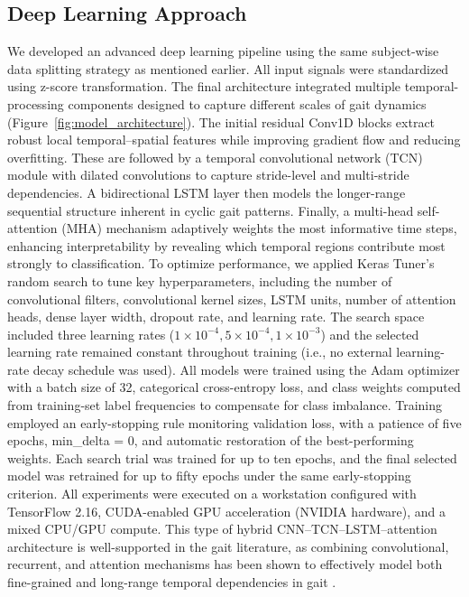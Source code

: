 \documentclass[sensors,article,accept,pdftex,moreauthors]{Definitions/mdpi}
\begin{document}
\subsection{Deep Learning Approach}
\textcolor{revision}{We developed an advanced deep learning pipeline using the same subject-wise data splitting strategy as mentioned earlier. All input \textcolor{revision}{signals} were standardized using z-score transformation. The final architecture integrated multiple temporal-processing components designed to capture different scales of gait dynamics (Figure~\ref{fig:model_architecture}). The initial residual Conv1D blocks extract robust local temporal--spatial features while improving gradient flow and reducing overfitting. These are followed by a temporal convolutional network (TCN) module with dilated convolutions to capture stride-level and multi-stride dependencies. A bidirectional LSTM layer then models the longer-range sequential structure inherent in cyclic gait patterns. Finally, a multi-head self-attention (MHA) mechanism adaptively weights the most informative time steps, enhancing interpretability by revealing which temporal regions contribute most strongly to classification. To optimize performance, we applied Keras Tuner’s random search to tune key hyperparameters, including the number of convolutional filters, convolutional kernel sizes, LSTM units, number of attention heads, dense layer width, dropout rate, and learning rate. {The search space included three learning rates ($1 \times 10^{-4}, 5 \times 10^{-4}, 1 \times 10^{-3}$) and the selected learning rate remained constant throughout training (i.e., no external learning-rate decay schedule was used). All models were trained using the Adam optimizer with a batch size of 32, categorical cross-entropy loss, and class weights computed from training-set label frequencies to compensate for class imbalance. Training employed an early-stopping rule monitoring validation loss, with a patience of five epochs, min\_delta = 0, and automatic restoration of the best-performing weights. Each search trial was trained for up to ten epochs, and the final selected model was retrained for up to fifty epochs under the same early-stopping criterion. All experiments were executed on a workstation configured with TensorFlow 2.16, CUDA-enabled GPU acceleration (NVIDIA hardware), and a mixed CPU/GPU compute}. This type of hybrid CNN–TCN–LSTM–attention architecture is well-supported in the gait literature, as combining convolutional, recurrent, and attention mechanisms has been shown to effectively model both fine-grained and long-range temporal dependencies in gait \cite{burges2024gait, 10862239, LV2025199}.}
\end{document}
